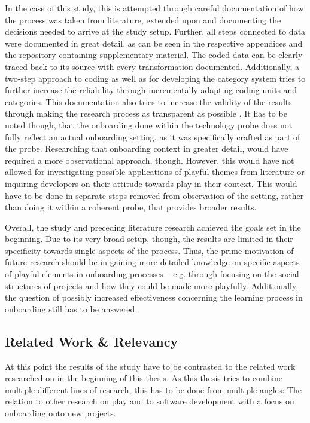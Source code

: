 In the case of this study, this is attempted through careful documentation of how the process was taken from literature, extended upon and documenting the decisions needed to arrive at the study setup. Further, all steps connected to data were documented in great detail, as can be seen in the respective appendices and the repository containing supplementary material. The coded data can be clearly traced back to its source with every transformation documented. Additionally, a two-step approach to coding as well as for developing the category system tries to further increase the reliability through incrementally adapting coding units and categories. This documentation also tries to increase the validity of the results through making the research process as transparent as possible \cite[p. 546]{flick2018introduction}. It has to be noted though, that the onboarding done within the technology probe does not fully reflect an actual onboarding setting, as it was specifically crafted as part of the probe. Researching that onboarding context in greater detail, would have required a more observational approach, though. However, this would have not allowed for investigating possible applications of playful themes from literature or inquiring developers on their attitude towards play in their context. This would have to be done in separate steps removed from observation of the setting, rather than doing it within a coherent probe, that provides broader results.

Overall, the study and preceding literature research achieved the goals set in the beginning. Due to its very broad setup, though, the results are limited in their specificity towards single aspects of the process. Thus, the prime motivation of future research should be in gaining more detailed knowledge on specific aspects of playful elements in onboarding processes -- e.g. through focusing on the social structures of projects and how they could be made more playfully. Additionally, the question of possibly increased effectiveness concerning the learning process in onboarding still has to be answered.

\subsection{Related Work \& Relevancy}

At this point the results of the study have to be contrasted to the related work researched on in the beginning of this thesis. As this thesis tries to combine multiple different lines of research, this has to be done from multiple angles: The relation to other research on play and to software development with a focus on onboarding onto new projects.

